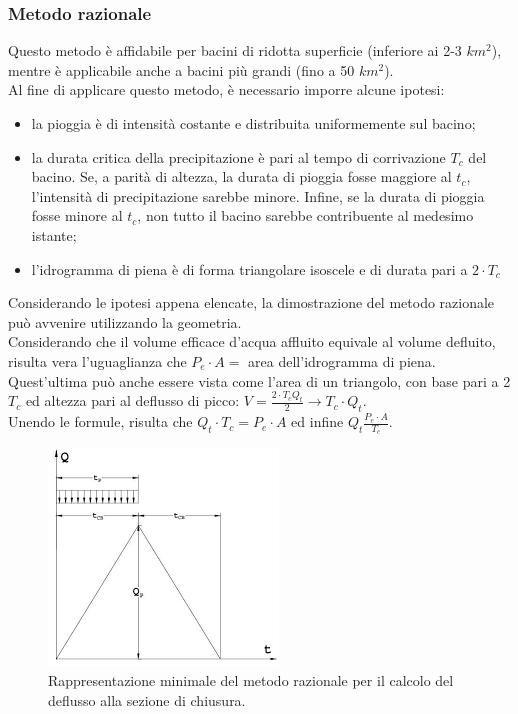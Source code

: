 \subsubsection{Metodo razionale}
Questo metodo è affidabile per bacini di ridotta superficie (inferiore ai 2-3 $km^2$), mentre è applicabile anche a bacini più grandi (fino a 50 $km^2$).\\
Al fine di applicare questo metodo, è necessario imporre alcune ipotesi:
\begin{itemize}
    \item la pioggia è di intensità costante e distribuita uniformemente sul bacino;
    \item la durata critica della precipitazione è pari al tempo di corrivazione $T_c$ del bacino. Se, a parità di altezza, la durata di pioggia fosse maggiore al $t_c$, l'intensità di precipitazione sarebbe minore. Infine, se la durata di pioggia fosse minore al $t_c$, non tutto il bacino sarebbe contribuente al medesimo istante;
    \item l'idrogramma di piena è di forma triangolare isoscele e di durata pari a $2 \cdot T_c$
\end{itemize}
Considerando le ipotesi appena elencate, la dimostrazione del metodo razionale può avvenire utilizzando la geometria.\\
Considerando che il volume efficace d'acqua affluito equivale al volume defluito, risulta vera l'uguaglianza che $P_e \cdot A =$ area dell'idrogramma di piena. Quest'ultima può anche essere vista come l'area di un triangolo, con base pari a 2$T_c$ ed altezza pari al deflusso di picco: $V = \frac{2 \cdot T_c Q_t}{2} \rightarrow T_c \cdot Q_t$.\\
Unendo le formule, risulta che $Q_t \cdot T_c = P_e \cdot A$ ed infine $Q_t \frac{P_e \cdot A}{T_c}$.

\begin{figure}[H]  \centering
    \includegraphics[scale=0.75]{immagini/metodo_razionale_deflusso.png}
    \caption{Rappresentazione minimale del metodo razionale per il calcolo del deflusso alla sezione di chiusura.}
    \label{metodo_razionale_deflusso}
\end{figure}

